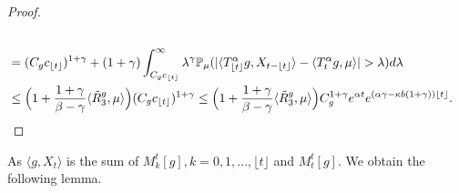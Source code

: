 \documentclass[12pt, a4paper]{amsart}
\theoremstyle{definition}
\numberwithin{equation}{section}
\begin{document}
\begin{proof}
\begin{align}
     \\ & = (C_g c_{\lfloor t \rfloor})^{1+\gamma}+(1+\gamma)\int_{C_g c_{\lfloor t \rfloor}}^\infty \lambda^{\gamma}\mathbb P_\mu(|\langle T^{\alpha}_{\lfloor t \rfloor}g,X_{t-\lfloor t\rfloor}\rangle-\langle T^{\alpha}_t g, \mu\rangle|> \lambda) d\lambda
     \\ &\leq \Big(1+\frac{1+\gamma}{\beta-\gamma}\langle \tilde{R}^g_3, \mu\rangle\Big) (C_g c_{\lfloor t \rfloor})^{1+\gamma}\leq \Big(1+\frac{1+\gamma}{\beta-\gamma}\langle \tilde{R}^g_3, \mu\rangle\Big) C_g^{1+\gamma}e^{\alpha t}e^{(\alpha \gamma - \kappa b(1+\gamma))\lfloor t \rfloor}.
 \qedhere
\end{align}
\end{proof}

As $\langle g,X_t\rangle$ is the sum of $M_k^{t}[g], k=0,1,...,\lfloor t\rfloor$ and $M_t^t[g]$. We obtain the following lemma.
\end{document}
